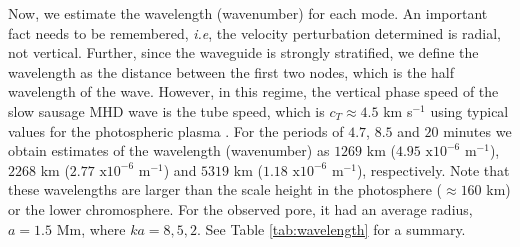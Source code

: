     Now, we estimate the wavelength (wavenumber) for each mode.
    An important fact needs to be remembered, \textit{i.e}, the velocity perturbation determined is radial, not vertical.
   	Further, since the waveguide is strongly stratified, we define the wavelength as the distance between the first two nodes, which is the half wavelength of the wave.	
    However, in this regime, the vertical phase speed of the slow sausage MHD wave is the tube speed, which is $c_T\approx4.5$ km s$^{-1}$ using typical values for the photospheric plasma \citep{WPMC,evans}.
    For the periods of $4.7$, $8.5$ and $20$ minutes we obtain estimates of the wavelength (wavenumber) as $1269$ km ($4.95$ $\mathrm{x}10^{-6}$ m$^{-1}$), $2268$ km ($2.77$ $\mathrm{x}10^{-6}$ m$^{-1}$) and $5319$ km ($1.18$ $\mathrm{x}10^{-6}$ m$^{-1}$), respectively.
    Note that these wavelengths are larger than the scale height in the photosphere ($\approx 160$ km)  or the lower chromosphere.
    For the observed pore, it had an average radius, $a=1.5$ Mm, where $ka= 8, 5, 2$.
    See Table \ref{tab:wavelength} for a summary.
    
